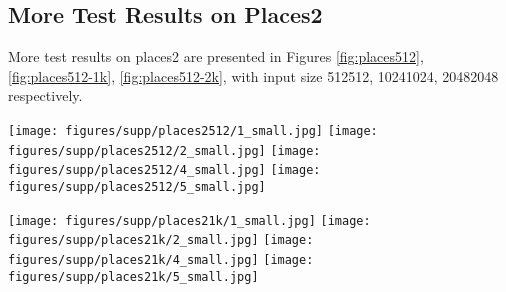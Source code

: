 \documentclass[oribibl]{llncs}  \usepackage[width=122mm,left=12mm,paperwidth=146mm,height=193mm,top=12mm,paperheight=217mm]{geometry}
\begin{document}
\subsection*{More Test Results on Places2}
More test results on places2 are presented in Figures \ref{fig:places512}, \ref{fig:places512-1k}, \ref{fig:places512-2k}, with input size 512512, 10241024, 20482048 respectively. 
\begin{figure*}[t]
	\begin{center}
		\texttt{[image: figures/supp/places2512/1\_small.jpg]}
		\texttt{[image: figures/supp/places2512/2\_small.jpg]}
		\texttt{[image: figures/supp/places2512/4\_small.jpg]}
		\texttt{[image: figures/supp/places2512/5\_small.jpg]}
		\subfloat[Input ]{\hspace{.125\linewidth}}
		\subfloat[GT]{\hspace{.125\linewidth}}
		\subfloat[DeepFillV1]{\hspace{.125\linewidth}}
		\subfloat[DeepFillV2 ]{\hspace{.125\linewidth}}
		\subfloat[pconv ]{\hspace{.125\linewidth}}
		\subfloat[Ours]{\hspace{.125\linewidth}}
		\caption{Test results on places2 validation datasets with input size of 512  512.}
		\label{fig:places512}
	\end{center}
\end{figure*}



\begin{figure*}[t]
	\begin{center}
		\texttt{[image: figures/supp/places21k/1\_small.jpg]}
		\texttt{[image: figures/supp/places21k/2\_small.jpg]}
		\texttt{[image: figures/supp/places21k/4\_small.jpg]}
		\texttt{[image: figures/supp/places21k/5\_small.jpg]}
		\subfloat[Input ]{\hspace{.125\linewidth}}
		\subfloat[GT]{\hspace{.125\linewidth}}
		\subfloat[DeepFillV1]{\hspace{.125\linewidth}}
		\subfloat[DeepFillV2 ]{\hspace{.125\linewidth}}
		\subfloat[pconv ]{\hspace{.125\linewidth}}
		\subfloat[Ours]{\hspace{.125\linewidth}}
		\caption{Test results on places2 validation datasets with input size of 1024  1024.}
		\label{fig:places512-1k}
	\end{center}
\end{figure*}
\end{document}
